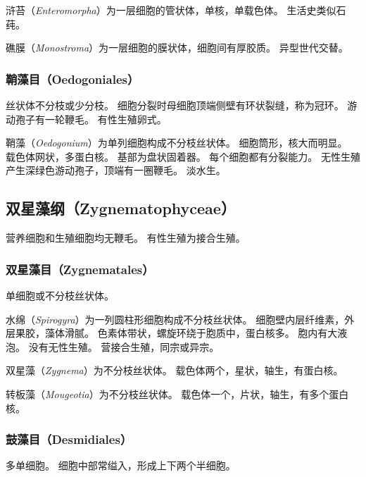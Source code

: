\documentclass[11pt]{article}
\begin{document}
\newline

浒苔（\textit{Enteromorpha}）为一层细胞的管状体，单核，单载色体。
生活史类似石莼。

\newline

礁膜（\textit{Monostroma}）为一层细胞的膜状体，细胞间有厚胶质。
异型世代交替。

\subsubsection{鞘藻目（Oedogoniales）}
丝状体不分枝或少分枝。
细胞分裂时母细胞顶端侧壁有环状裂缝，称为冠环。
游动孢子有一轮鞭毛。
有性生殖卵式。

\newline

鞘藻（\textit{Oedogonium}）为单列细胞构成不分枝丝状体。
细胞筒形，核大而明显。
载色体网状，多蛋白核。
基部为盘状固着器。
每个细胞都有分裂能力。
无性生殖产生深绿色游动孢子，顶端有一圈鞭毛。
淡水生。

\subsection{双星藻纲（Zygnematophyceae）}
营养细胞和生殖细胞均无鞭毛。
有性生殖为接合生殖。

\subsubsection{双星藻目（Zygnematales）}
单细胞或不分枝丝状体。

\newline

水绵（\textit{Spirogyra}）为一列圆柱形细胞构成不分枝丝状体。
细胞壁内层纤维素，外层果胶，藻体滑腻。
色素体带状，螺旋环绕于胞质中，蛋白核多。
胞内有大液泡。
没有无性生殖。
营接合生殖，同宗或异宗。

\newline

双星藻（\textit{Zygnema}）为不分枝丝状体。
载色体两个，星状，轴生，有蛋白核。

\newline

转板藻（\textit{Mougeotia}）为不分枝丝状体。
载色体一个，片状，轴生，有多个蛋白核。

\subsubsection{鼓藻目（Desmidiales）}
多单细胞。
细胞中部常缢入，形成上下两个半细胞。
\end{document}
